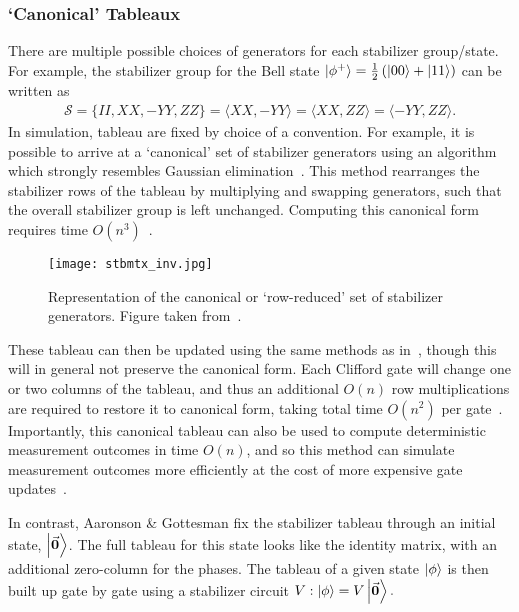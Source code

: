 \subsubsection{`Canonical' Tableaux}
There are multiple possible choices of generators for each stabilizer group/state. For example, the stabilizer group for the Bell state $\ket{\phi^{+}}=\frac{1}{2}\left(\ket{00}+\ket{11}\right)$ can be written as
\begin{align}
    \mathcal{S} = \{II, XX, -YY, ZZ\} = \langle XX,-YY\rangle = \langle XX, ZZ\rangle = \langle -YY,ZZ\rangle.
\end{align}
In simulation, tableau are fixed by choice of a convention. For example, it is possible to arrive at a `canonical' set of stabilizer generators using an algorithm which strongly resembles Gaussian elimination~\cite{Garcia2012}. This method rearranges the stabilizer rows of the tableau by multiplying and swapping generators, such that the overall stabilizer group is left unchanged. Computing this canonical form requires  time $O(n^{3})$~\cite{Garcia2012}.
\begin{figure}[H]
    \centering
    \texttt{[image: stbmtx\_inv.jpg]}
    \caption{Representation of the canonical or `row-reduced' set of stabilizer generators. Figure taken from~\cite{Garcia2012}.}
\label{fig:canoncialtableau}
\end{figure}
These tableau can then be updated using the same methods as in~\cite{Aaronson2004}, though this will in general not preserve the canonical form. Each Clifford gate will change one or two columns of the tableau, and thus an additional $O(n)$ row multiplications are required to restore it to canonical form, taking total time $O(n^{2})$ per gate~\cite{Garcia2015}.
Importantly, this canonical tableau can also be used to compute deterministic measurement outcomes in time $O(n)$, and so this method can simulate measurement outcomes more efficiently at the cost of more expensive gate updates~\cite{Garcia2015}.\par
In contrast, Aaronson \& Gottesman fix the stabilizer tableau through an initial state, $\ket{\va{0}}$. The full tableau for this state looks like the identity matrix, with an additional zero-column for the phases. The tableau of a given state $\ket{\phi}$ is then built up gate by gate using a stabilizer circuit $V:\ket{\phi}=V\ket{\va{0}}.$
